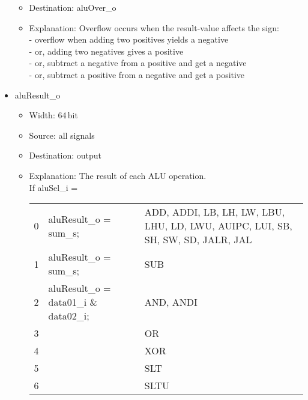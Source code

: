 \begin{itemize}
\begin{itemize}
    \item Destination: aluOver\_o
    \item Explanation: Overflow occurs when the result-value affects the sign: \\
             - overflow when adding two positives yields a negative \\
             - or, adding two negatives gives a positive \\
             - or, subtract a negative from a positive and get a negative \\
             - or, subtract a positive from a negative and get a positive
  \end{itemize}
  \item aluResult\_o
  \begin{itemize}
    \item Width: 64\,bit
    \item Source: all signals
    \item Destination: output
    \item Explanation: The result of each ALU operation.\\  If aluSel\_i = \\
                                            \begin{tabularx}{0.9\textwidth}{llX}
                                              0 & aluResult\_o = sum\_s; & ADD, ADDI, LB, LH, LW, LBU, LHU, LD, LWU, AUIPC, LUI, SB, SH, SW, SD, JALR, JAL \\
                                              1 & aluResult\_o = sum\_s; & SUB \\
                                              2 & aluResult\_o = data01\_i \& data02\_i; & AND, ANDI \\
                                              3 && \mbox{OR} \\
                                              4 && \mbox{XOR} \\
                                              5 && \mbox{SLT} \\
                                              6 && \mbox{SLTU} \\
                                            \end{tabularx}\\
  \end{itemize}
\end{itemize}
